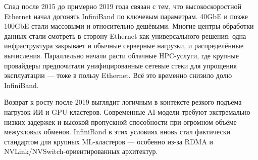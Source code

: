 \documentclass[14pt,a4paper]{extarticle}
\begin{document}
Спад после 2015 до примерно 2019 года связан с тем, что высокоскоростной
Ethernet начал догонять InfiniBand по ключевым параметрам. 40GbE и позже 100GbE
стали массовыми и относительно дешёвыми. Многие центры обработки данных стали
смотреть в сторону Ethernet как универсального решения: одна инфраструктура
закрывает и обычные серверные нагрузки, и распределённые вычисления.
Параллельно начали расти облачные HPC-услуги, где крупные провайдеры
предпочитали унифицированные сетевые стеки для упрощения эксплуатации — тоже в
пользу Ethernet. Всё это временно снизило долю InfiniBand.

Возврат к росту после 2019 выглядит логичным в контексте резкого подъёма
нагрузок ИИ и GPU-кластеров. Современные AI-модели требуют экстремально низких
задержек и высокой пропускной способности при огромном объёме межузловых
обменов. InfiniBand в этих условиях вновь стал фактически стандартом для
крупных ML-кластеров — особенно из-за RDMA и NVLink/NVSwitch-ориентированных
архитектур.

\newpage
\end{document}

